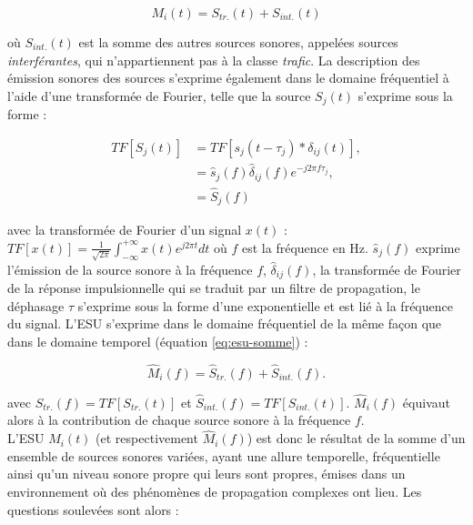 \begin{equation}\label{eq:esu-somme}
M_i(t) = S_{tr.}(t)+S_{int.}(t)
\end{equation}

où $S_{int.}(t)$ est la somme des autres sources sonores, appelées sources \textit{interférantes}, qui n'appartiennent pas à la classe \textit{trafic}. 
La description des émission sonores des sources s'exprime également dans le domaine fréquentiel à l'aide d'une transformée de Fourier, telle que la source $S_j(t)$ s'exprime sous la forme : 

\begin{subequations}
\begin{align}
TF\left[S_j(t)\right] & = TF\left[s_j(t-\tau_j) \ast \delta_{ij}(t) \right],\\
 & = \hat{s}_j(f)\hat{\delta}_{ij}(f)e^{-j2\pi f \tau_j},\\
 & = \hat{S}_j(f)
\end{align}
\end{subequations}

avec la transformée de Fourier d'un signal $x(t)$ : $TF\left[x(t)\right] = \frac{1}{\sqrt{2\pi}}\int_{-\infty}^{+\infty} x(t)e^{j2\pi t} dt$ où $f$ est la fréquence en Hz. $\hat{s}_j(f)$ exprime l'émission de la source sonore à la fréquence $f$, $\hat{\delta}_{ij}(f)$, la transformée de Fourier de la réponse impulsionnelle qui se traduit par un filtre de propagation, le déphasage $\tau$ s'exprime sous la forme d'une exponentielle et est lié à la fréquence du signal. L'ESU s'exprime dans le domaine fréquentiel de la même façon que dans le domaine temporel (équation \ref{eq:esu-somme}) : 

\begin{equation}
\hat{M}_i(f) = \hat{S}_{tr.}(f)+\hat{S}_{int.}(f).
\end{equation}

avec $\hat{S}_{tr.}(f) = TF\left[ S_{tr.}(t)\right]$ et $\hat{S}_{int.}(f) = TF\left[ S_{int.}(t)\right]$. $\hat{M}_i(f)$ équivaut alors à la contribution de chaque source sonore à la fréquence $f$.\\

L'ESU $M_i(t)$ (et respectivement $\hat{M}_i(f)$) est donc le résultat de la somme d'un ensemble de sources sonores variées, ayant une allure temporelle, fréquentielle ainsi qu'un niveau sonore propre qui leurs sont propres, émises dans un environnement où des phénomènes de propagation complexes ont lieu. Les questions soulevées sont alors :

